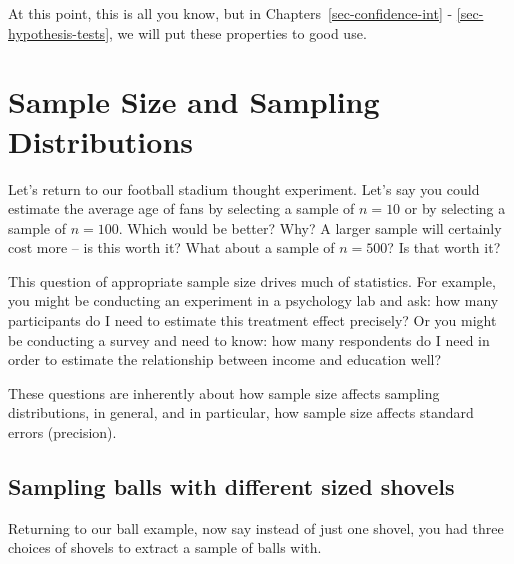 \documentclass[
  letterpaper,
  DIV=11,
  numbers=noendperiod]{scrreprt}
\theoremstyle{definition}
\theoremstyle{remark}
\begin{document}
At this point, this is all you know, but in
Chapters~\ref{sec-confidence-int} - \ref{sec-hypothesis-tests}, we will
put these properties to good use.

\hypertarget{sec-size}{%
\section{Sample Size and Sampling Distributions}\label{sec-size}}

Let's return to our football stadium thought experiment. Let's say you
could estimate the average age of fans by selecting a sample of
\(n = 10\) or by selecting a sample of \(n = 100\). Which would be
better? Why? A larger sample will certainly cost more -- is this worth
it? What about a sample of \(n = 500\)? Is that worth it?

This question of appropriate sample size drives much of statistics. For
example, you might be conducting an experiment in a psychology lab and
ask: how many participants do I need to estimate this treatment effect
precisely? Or you might be conducting a survey and need to know: how
many respondents do I need in order to estimate the relationship between
income and education well?

These questions are inherently about how sample size affects sampling
distributions, in general, and in particular, how sample size affects
standard errors (precision).

\hypertarget{sec-eg1}{%
\subsection{Sampling balls with different sized shovels}\label{sec-eg1}}

Returning to our ball example, now say instead of just one shovel, you
had three choices of shovels to extract a sample of balls with.
\end{document}
